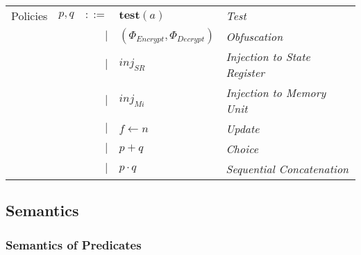 \documentclass[12pt, letterpaper]{article}
\def \sysname {\textsc{GARUDA 2.0}\xspace}
\begin{document}
          {\centering
          \begin{tabular}{l c r l l}
            Policies  & $p,q$ & $::=$  & $\mathbf{test}(a)$ & \textit{Test}      \\
                      &       & $\mid$ & $(\Phi_{Encrypt}, 
                                           \Phi_{Decrypt})$ & \textit{Obfuscation} \\
                      &       & $\mid$ & $inj_{SR}$         & \textit{Injection to State Register} \\
                      &       & $\mid$ & $inj_{Mi}$         & \textit{Injection to Memory Unit} \\
                      &       & $\mid$ & $f \leftarrow n$   & \textit{Update}   \\
                      &       & $\mid$ & $p + q$            & \textit{Choice}   \\
                      &       & $\mid$ & $p \cdot q$        & \textit{Sequential Concatenation} \\
          \end{tabular}}

    \subsection{Semantics}\label{sec:spec:sem}
      \subsubsection{Semantics of Predicates}\label{sec:spec:sem:pred}
    
\end{document}
